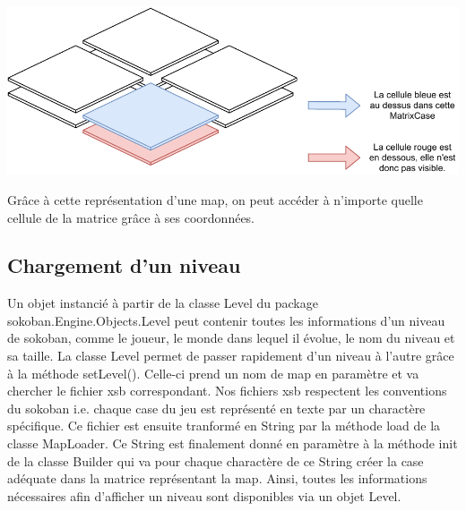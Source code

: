 \documentclass[../main.tex]{subfiles}
\begin{document}
\includegraphics[width=1\textwidth,clip]{images/matrixCase.pdf}

Grâce à cette représentation d'une map, on peut accéder à n'importe quelle cellule de la matrice grâce à ses coordonnées.

\subsection{Chargement d'un niveau}
Un objet instancié à partir de la classe Level du package sokoban.Engine.Objects.Level peut contenir toutes les informations d'un niveau de sokoban,
comme le joueur, le monde dans lequel il évolue, le nom du niveau et sa taille.
La classe Level permet de passer rapidement d'un niveau à l'autre grâce à la méthode setLevel().
Celle-ci prend un nom de map en paramètre et va chercher le fichier xsb correspondant.
Nos fichiers xsb respectent les conventions du sokoban i.e. chaque case du jeu est représenté en texte par un charactère spécifique.
Ce fichier est ensuite tranformé en String par la méthode load de la classe MapLoader.
Ce String est finalement donné en paramètre à la méthode init de la classe Builder qui va pour chaque charactère de ce String créer la case adéquate dans la matrice représentant la map.
Ainsi, toutes les informations nécessaires afin d'afficher un niveau sont disponibles via un objet Level.
\end{document}
